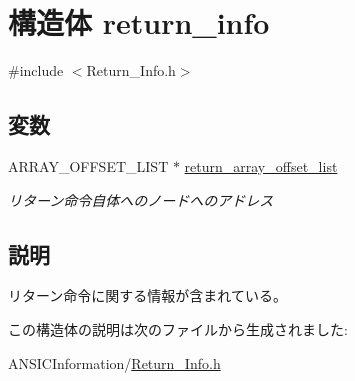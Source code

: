 \section{構造体 return\_\-info}
\label{structreturn__info}


{\ttfamily \#include $<$Return\_\-Info.h$>$}

\subsection*{変数}
\begin{DoxyCompactItemize}
\item 
ARRAY\_\-OFFSET\_\-LIST $\ast$ \hyperlink{structreturn__info_a4a73b7eb55cc8db61c9175f7f0d98a40}{return\_\-array\_\-offset\_\-list}\label{structreturn__info_a4a73b7eb55cc8db61c9175f7f0d98a40}

\begin{DoxyCompactList}\small\item\em リターン命令自体へのノードへのアドレス \item\end{DoxyCompactList}\end{DoxyCompactItemize}


\subsection{説明}
リターン命令に関する情報が含まれている。 

この構造体の説明は次のファイルから生成されました:\begin{DoxyCompactItemize}
\item 
ANSICInformation/\hyperlink{Return__Info_8h}{Return\_\-Info.h}\end{DoxyCompactItemize}
